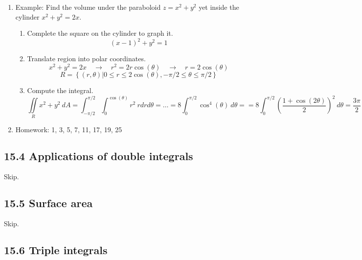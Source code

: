 \documentclass{article}
\begin{document}
\begin{enumerate}
\item Example: Find the volume under the paraboloid $z=x^2+y^2$ yet inside the cylinder $x^2+y^2=2x$.
\begin{enumerate}
\item Complete the square on the cylinder to graph it.
\[
(x-1)^2+y^2=1
\]
\item Translate region into polar coordinates.
\[
x^2+y^2 = 2x \quad \rightarrow \quad r^2 = 2r\cos(\theta) \quad \rightarrow \quad r=2\cos(\theta)
\]
\[
R = \left\{ (r,\theta) | 0 \leq r \leq 2\cos(\theta), -\pi/2 \leq \theta \leq \pi/2 \right\}
\]
\item Compute the integral.
\[
\iint\limits_R x^2+y^2 ~dA = \int_{-\pi/2}^{\pi/2} \int_0^{\cos(\theta)} r^2 ~rdrd\theta = \dots = 8\int_0^{\pi/2} \cos^4(\theta) ~d\theta = = 8\int_0^{\pi/2} \left(\frac{1+\cos(2\theta)}{2} \right)^2 ~d\theta = \frac{3\pi}{2}
\]
\end{enumerate}

\item Homework: 1, 3, 5, 7, 11, 17, 19, 25

\end{enumerate}


\subsection{15.4 Applications of double integrals}

Skip.

\subsection{15.5 Surface area}

Skip.

\subsection{15.6 Triple integrals}
\end{document}
